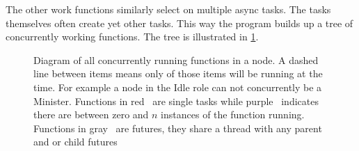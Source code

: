 The other work functions similarly select on multiple async tasks. The tasks themselves often create yet other tasks. This way the program builds up a tree of concurrently working functions. The tree is illustrated in \cref{fig:tree}.
%
\clearpage
\thispagestyle{empty}
\begin{figure}[htbp]
	\centering
	
	\caption{Diagram of all concurrently running functions in a node. A dashed line between items means only of those items will be running at the time. For example a node in the Idle role can not concurrently be a Minister. Functions in red~\taskLeg{} are single tasks while purple~\tasksLeg{} indicates there are between zero and $n$ instances of the function running. Functions in gray~\futureLeg{} are futures, they share a thread with any parent and or child futures}
	\label{fig:tree}
\end{figure}
\clearpage

%
